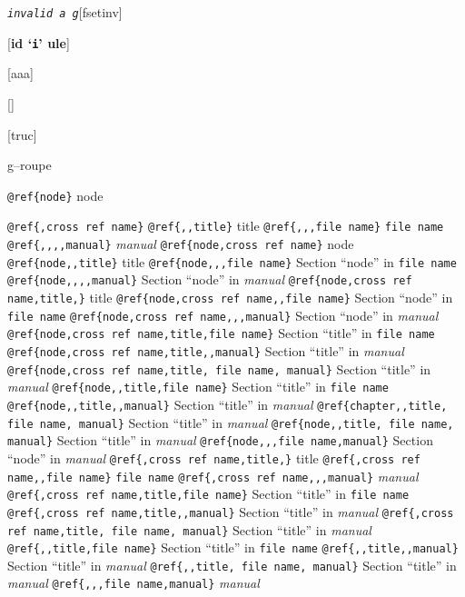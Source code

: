 \documentclass{book}
\begin{document}
%

\noindent\texttt{\textsl{invalid} \EmbracOn{}\textnormal{\textsl{a g}}\EmbracOff{}}\hfill[fsetinv]



%
\noindent\texttt{}\hfill[\textbf{id `\texttt{i}' ule}]




\noindent\texttt{}\hfill[aaa]



\noindent\texttt{}\hfill[]



\noindent\texttt{}\hfill[truc]




g--roupe

\texttt{@ref\{node\}} node

\texttt{@ref\{,cross ref name\}} 
\texttt{@ref\{,,title\}} title
\texttt{@ref\{,,,file name\}} \texttt{file name}
\texttt{@ref\{,,,,manual\}} \textsl{manual}
\texttt{@ref\{node,cross ref name\}} node
\texttt{@ref\{node,,title\}} title
\texttt{@ref\{node,,,file name\}} Section ``node'' in \texttt{file name}
\texttt{@ref\{node,,,,manual\}} Section ``node'' in \textsl{manual}
\texttt{@ref\{node,cross ref name,title,\}} title
\texttt{@ref\{node,cross ref name,,file name\}} Section ``node'' in \texttt{file name}
\texttt{@ref\{node,cross ref name,,,manual\}} Section ``node'' in \textsl{manual}
\texttt{@ref\{node,cross ref name,title,file name\}} Section ``title'' in \texttt{file name}
\texttt{@ref\{node,cross ref name,title,,manual\}} Section ``title'' in \textsl{manual}
\texttt{@ref\{node,cross ref name,title, file name, manual\}} Section ``title'' in \textsl{manual}
\texttt{@ref\{node,,title,file name\}} Section ``title'' in \texttt{file name}
\texttt{@ref\{node,,title,,manual\}} Section ``title'' in \textsl{manual}
\texttt{@ref\{chapter,,title, file name, manual\}} Section ``title'' in \textsl{manual}
\texttt{@ref\{node,,title, file name, manual\}} Section ``title'' in \textsl{manual}
\texttt{@ref\{node,,,file name,manual\}} Section ``node'' in \textsl{manual}
\texttt{@ref\{,cross ref name,title,\}} title
\texttt{@ref\{,cross ref name,,file name\}} \texttt{file name}
\texttt{@ref\{,cross ref name,,,manual\}} \textsl{manual}
\texttt{@ref\{,cross ref name,title,file name\}} Section ``title'' in \texttt{file name}
\texttt{@ref\{,cross ref name,title,,manual\}} Section ``title'' in \textsl{manual}
\texttt{@ref\{,cross ref name,title, file name, manual\}} Section ``title'' in \textsl{manual}
\texttt{@ref\{,,title,file name\}} Section ``title'' in \texttt{file name}
\texttt{@ref\{,,title,,manual\}} Section ``title'' in \textsl{manual}
\texttt{@ref\{,,title, file name, manual\}} Section ``title'' in \textsl{manual}
\texttt{@ref\{,,,file name,manual\}} \textsl{manual}
\end{document}
